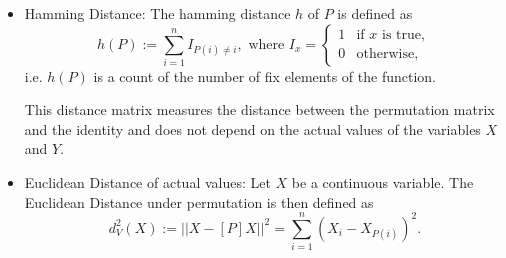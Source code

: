 \documentclass[12]{report}
\begin{document}
\begin{itemize}

\item Hamming Distance: The hamming distance $h$ of $P$ is defined as 
\[
h(P) := \sum_{i=1}^n I_{P(i) \neq i},  \text{ where } I_{x} = \left \{ 
\begin{array}{ll}
1 & \text{if } x \text{ is true},\\
0 & \text{otherwise},
\end{array} \right.
\]
i.e. $h(P)$ is a count of the number of fix elements of the function.




This distance matrix measures the distance between the permutation matrix and the identity and does not depend on the actual values of the variables $X$ and $Y$. 




\item Euclidean Distance of actual values: 
Let $X$ be a continuous variable. The Euclidean Distance under permutation is then defined as 
\[
d^2_V(X) := || X - [P]X||^2 = \sum_{i=1}^n (X_i - X_{P(i)})^2.
\]







\end{itemize}
\end{document}
